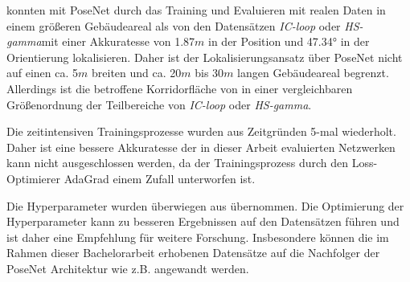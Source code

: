 
\citet{walchImageBasedLocalizationUsing2017} konnten mit PoseNet durch das Training und Evaluieren mit realen Daten in einem größeren Gebäudeareal als von den Datensätzen \textit{IC-loop} oder \textit{HS-gamma}mit einer Akkuratesse von 1.87$m$ in der Position und 47.34° in der Orientierung lokalisieren. Daher ist der Lokalisierungsansatz über PoseNet nicht auf einen ca. 5$m$ breiten und ca. 20$m$ bis 30$m$ langen Gebäudeareal begrenzt. Allerdings ist die betroffene Korridorfläche von \citet{acharyaBIMPoseNetIndoorCamera2019} in einer vergleichbaren Größenordnung der Teilbereiche von \textit{IC-loop} oder \textit{HS-gamma}.







%






Die zeitintensiven Trainingsprozesse wurden aus Zeitgründen 5-mal wiederholt. Daher ist eine bessere Akkuratesse der in dieser Arbeit evaluierten Netzwerken kann nicht ausgeschlossen werden, da der Trainingsprozess durch den Loss-Optimierer AdaGrad einem Zufall unterworfen ist.

Die Hyperparameter wurden überwiegen aus \citet{acharyaBIMPoseNetIndoorCamera2019} übernommen. Die Optimierung der Hyperparameter kann zu besseren Ergebnissen auf den Datensätzen führen und ist daher eine Empfehlung für weitere Forschung. Insbesondere können die im Rahmen dieser Bachelorarbeit erhobenen Datensätze auf die Nachfolger der PoseNet Architektur wie z.B. \cite{kendallModellingUncertaintyDeep2016, walchImageBasedLocalizationUsing2017, kendallGeometricLossFunctions2017, clarkVidLocDeepSpatioTemporal2017} angewandt werden.


% 

